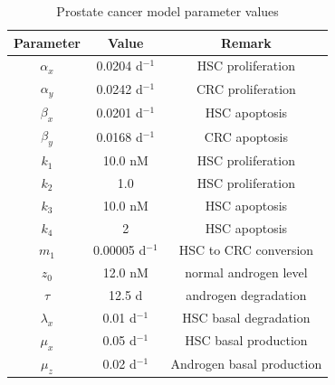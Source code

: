 \begin{table}[ht]
\caption{Prostate cancer model parameter values\label{prostate}}
\centering
\small
\begin{tabular}{|c|c|c|}
\hline
Parameter  & Value & Remark  \\\hline
$\alpha_x$ & 0.0204 d$^{-1}$ & HSC proliferation \\
$\alpha_y$ & 0.0242 d$^{-1}$ & CRC proliferation  \\
$\beta_x$  & 0.0201 d$^{-1}$ & HSC apoptosis  \\
$\beta_y$  & 0.0168 d$^{-1}$ & CRC apoptosis \\
$k_1$     & 10.0 nM & HSC proliferation  \\
$k_2$     & 1.0 & HSC proliferation  \\
$k_3$     & 10.0 nM & HSC apoptosis  \\
$k_4$     &  2 & HSC apoptosis   \\
$m_1$     & 0.00005 d$^{-1}$ & HSC to CRC conversion  \\
$z_0$     & 12.0 nM & normal androgen level  \\
$\tau$     & 12.5 d & androgen degradation  \\
$\lambda_x$     & 0.01 d$^{-1}$ & HSC basal degradation \\
$\mu_x$     & 0.05 d$^{-1}$ & HSC basal production\\
$\mu_z$     & 0.02 d$^{-1}$ & Androgen basal production \\
\hline
\end{tabular}
\end{table}

